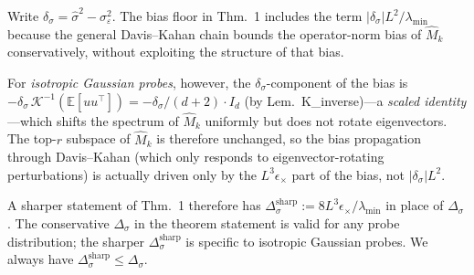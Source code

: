 \begin{remark}
\label{rem:variance_misspec}
Write $\delta_\sigma=\hat\sigma^2-\sigma_\varepsilon^2$. The bias floor
in Thm.~1 includes the term $|\delta_\sigma|L^2/\lambda_{\min}$
because the general Davis--Kahan chain bounds the operator-norm bias
of $\widehat M_k$ conservatively, without exploiting the structure of
that bias.

For \emph{isotropic Gaussian probes}, however, the $\delta_\sigma$-component
of the bias is
$-\delta_\sigma\,\mathcal K^{-1}(\mathbb E[uu^\top])=-\delta_\sigma/(d+2)\cdot I_d$
(by Lem.~K\_inverse)---a \emph{scaled identity}---which shifts the
spectrum of $\widehat M_k$ uniformly but does not rotate eigenvectors.
The top-$r$ subspace of $\widehat M_k$ is therefore unchanged, so the
bias propagation through Davis--Kahan (which only responds to
eigenvector-rotating perturbations) is actually driven only by the
$L^3\epsilon_\times$ part of the bias, not $|\delta_\sigma|L^2$.

A sharper statement of Thm.~1 therefore has
$\Delta_\sigma^{\mathrm{sharp}}:=8 L^3\epsilon_\times/\lambda_{\min}$
in place of $\Delta_\sigma$. The conservative $\Delta_\sigma$ in the
theorem statement is valid for any probe distribution; the sharper
$\Delta_\sigma^{\mathrm{sharp}}$ is specific to isotropic Gaussian probes.
We always have $\Delta_\sigma^{\mathrm{sharp}}\le\Delta_\sigma$.
\end{remark}


